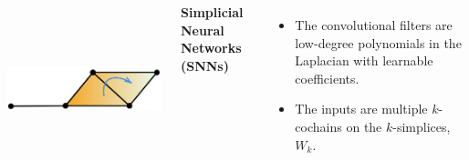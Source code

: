 \documentclass[landscape,a0paper,blockverticalspace = 5mm]{tikzposter}
\begin{document}
\begin{columns}
{{\begin{center}
\begin{minipage}{0.2\linewidth}
\begin{center}
          \vspace{1.2cm}

          \end{center}
      \end{minipage} \hspace{3.5cm}
	\begin{minipage}{0.2\linewidth}
	\begin{center}\
	\vspace{0.1cm}
          \includegraphics[height=3.9cm]{figures/glap2.png}


          \end{center}
      \end{minipage}
      \end{center}



 \begin{center}
\vspace{-1.5cm}
\Large{\textbf{Simplicial Neural Networks (SNNs)}}
\end{center}
\vspace{-0.5cm}
\begin{itemize}
\item The convolutional filters are low-degree polynomials in the Laplacian with learnable coefficients.
\item The inputs are multiple $k$-cochains on the $k$-simplices, $W_k$.
\end{itemize}

}}
\end{columns}
\end{document}

